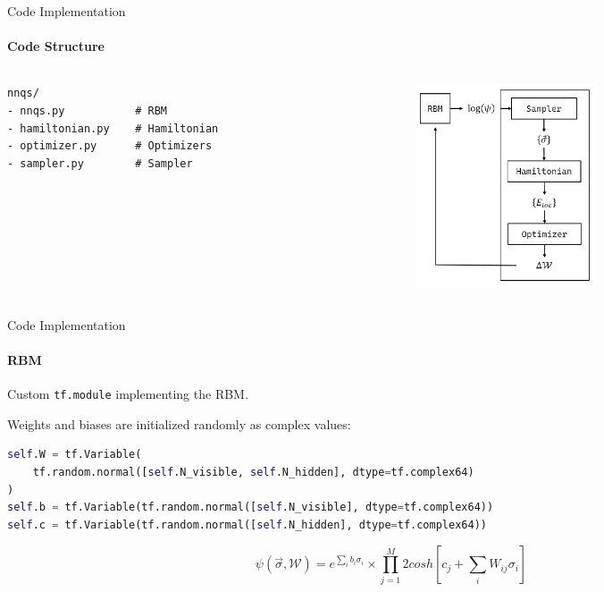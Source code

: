 \documentclass{beamer}
\begin{document}
\begin{frame}[fragile]{Code Implementation}
\framesubtitle{Code Structure}
\begin{columns}
\begin{column}{0.4\textwidth}
\begin{lstlisting}[style=kaolstplain]
nnqs/
- nnqs.py			# RBM
- hamiltonian.py	# Hamiltonian
- optimizer.py		# Optimizers
- sampler.py		# Sampler
\end{lstlisting}
\end{column}
\begin{column}{0.5\textwidth}
\includegraphics[height=6cm]{images/pipeline.png}
\end{column}
\end{columns}
\end{frame}

\begin{frame}[fragile]{Code Implementation}
\framesubtitle{RBM}

Custom \lstinline[style=kaolstplain]|tf.module| implementing the RBM.
\baselineskip

Weights and biases are initialized randomly as complex values:
\begin{lstlisting}[language=Python, style=kaolstplain]
self.W = tf.Variable(
	tf.random.normal([self.N_visible, self.N_hidden], dtype=tf.complex64)
)
self.b = tf.Variable(tf.random.normal([self.N_visible], dtype=tf.complex64))
self.c = tf.Variable(tf.random.normal([self.N_hidden], dtype=tf.complex64))
\end{lstlisting}

$$\psi\left(\vec{\sigma}, \mathcal{W}\right) = e^{\sum_{i} b_i \sigma_i} \times \prod_{j=1}^{M} {2 cosh\left[c_j + \sum_{i} W_{ij} \sigma_i\right]}$$

\end{frame}
\end{document}
